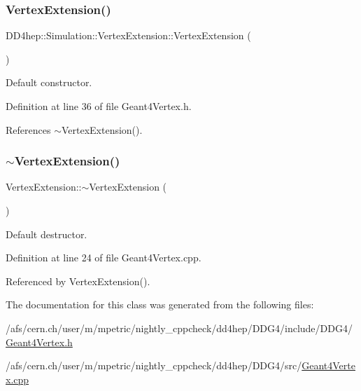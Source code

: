 \subsubsection{\texorpdfstring{Vertex\+Extension()}{VertexExtension()}}
{\footnotesize\ttfamily D\+D4hep\+::\+Simulation\+::\+Vertex\+Extension\+::\+Vertex\+Extension (\begin{DoxyParamCaption}{ }\end{DoxyParamCaption})\hspace{0.3cm}{\ttfamily [inline]}}



Default constructor. 



Definition at line 36 of file Geant4\+Vertex.\+h.



References $\sim$\+Vertex\+Extension().

\hypertarget{class_d_d4hep_1_1_simulation_1_1_vertex_extension_ada5f206230fe61718826c4cfe8eb7e9e}{}\label{class_d_d4hep_1_1_simulation_1_1_vertex_extension_ada5f206230fe61718826c4cfe8eb7e9e} 
\subsubsection{\texorpdfstring{$\sim$\+Vertex\+Extension()}{~VertexExtension()}}
{\footnotesize\ttfamily Vertex\+Extension\+::$\sim$\+Vertex\+Extension (\begin{DoxyParamCaption}{ }\end{DoxyParamCaption})\hspace{0.3cm}{\ttfamily [virtual]}}



Default destructor. 



Definition at line 24 of file Geant4\+Vertex.\+cpp.



Referenced by Vertex\+Extension().



The documentation for this class was generated from the following files\+:\begin{DoxyCompactItemize}
\item 
/afs/cern.\+ch/user/m/mpetric/nightly\+\_\+cppcheck/dd4hep/\+D\+D\+G4/include/\+D\+D\+G4/\hyperlink{_geant4_vertex_8h}{Geant4\+Vertex.\+h}\item 
/afs/cern.\+ch/user/m/mpetric/nightly\+\_\+cppcheck/dd4hep/\+D\+D\+G4/src/\hyperlink{_geant4_vertex_8cpp}{Geant4\+Vertex.\+cpp}\end{DoxyCompactItemize}
